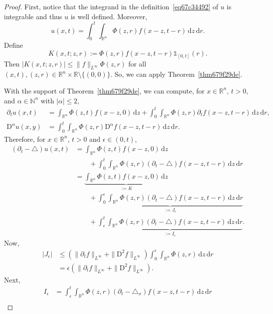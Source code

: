 \documentclass[a4paper,9pt]{amsart}
\newcommand{\N}{\mathbb{N}}	%
\newcommand{\R}{\mathbb{R}}	%
\newcommand{\did}{\,\mathrm{d}}	%
\newcommand{\de}{\partial}		%
\newcommand{\Diff}{\mathrm{D}}
\newcommand{\laplacian}{\triangle}
\newcommand{\one}{{\mathds 1\!}}
\theoremstyle{plain}
\theoremstyle{definition}
\theoremstyle{remark}
\begin{document}
\begin{proof}
	First, notice that the integrand in the definition~\eqref{eq67c34492} of $u$ is integrable and thus $u$ is well defined.
	Moreover,
	\begin{equation}
		u(x,t) = \int_0^t \int_{\R^n} \Phi(z,r) f(x-z,t-r) \did z\did r .
	\end{equation}
	Define
	\begin{equation}
		K(x,t;z,r) := \Phi(z,r) f(x-z,t-r) \one_{[0,t]}(r).
	\end{equation}
	Then $|K(x,t;z,r)| \le \|f\|_{L^\infty} \Phi(z,r)$ for all $(x,t),(z,r)\in\R^n\times\R\setminus\{(0,0)\}$.
	So, we can apply Theorem~\ref{thm679f29de}.
	
	With the support of Theorem~\ref{thm679f29de}, we can compute, for $x\in\R^n$, $t>0$, and $\alpha\in\N^n$ with $|\alpha|\le 2$,
	\begin{align*}
	 	\de_t u(x,t) 
		&= \int_{\R^n} \Phi(z,t) f(x-z,0) \did z
			+ \int_0^t \int_{\R^n} \Phi(z,r) \de_tf(x-z,t-r) \did z\did r , \\
		\Diff^\alpha u(x,y)
		&= \int_0^t \int_{\R^n} \Phi(z,r) \Diff^\alpha f(x-z,t-r) \did z\did r .
	\end{align*}
	Therefore, for $x\in\R^n$, $t>0$ and $\epsilon\in(0,t)$,
	\begin{align*}
		(\de_t - \laplacian)u(x,t)
		&= \int_{\R^n} \Phi(z,t) f(x-z,0) \did z \\
		&\qquad
			+ \int_0^t \int_{\R^n} \Phi(z,r) (\de_t - \laplacian)f(x-z,t-r) \did z\did r \\
		&= \underbrace{ \int_{\R^n} \Phi(z,t) f(x-z,0) \did z }_{:= K}\\
		&\qquad
			+ \underbrace{ \int_0^\epsilon \int_{\R^n} \Phi(z,r) (\de_t - \laplacian)f(x-z,t-r) \did z\did r }_{:= J_\epsilon} \\
		&\qquad
			+ \underbrace{ \int_\epsilon^t \int_{\R^n} \Phi(z,r) (\de_t - \laplacian)f(x-z,t-r) \did z\did r }_{:= I_\epsilon} .
	\end{align*}
	Now, 
	\begin{align*}
		|J_\epsilon| 
		&\le (\|\de_t f\|_{L^\infty} + \|\Diff^2f\|_{L^\infty} )
			\int_0^\epsilon \int_{\R^n} \Phi(z,r) \did z\did r \\
		&= \epsilon (\|\de_t f\|_{L^\infty} + \|\Diff^2f\|_{L^\infty} ) .
	\end{align*}
	Next,
	\begin{align*}
	 	I_\epsilon 
		&= \int_\epsilon^t \int_{\R^n} \Phi(z,r) (\de_t - \laplacian_x)f(x-z,t-r) \did z\did r \\

\end{align*}
\end{proof}
\end{document}
